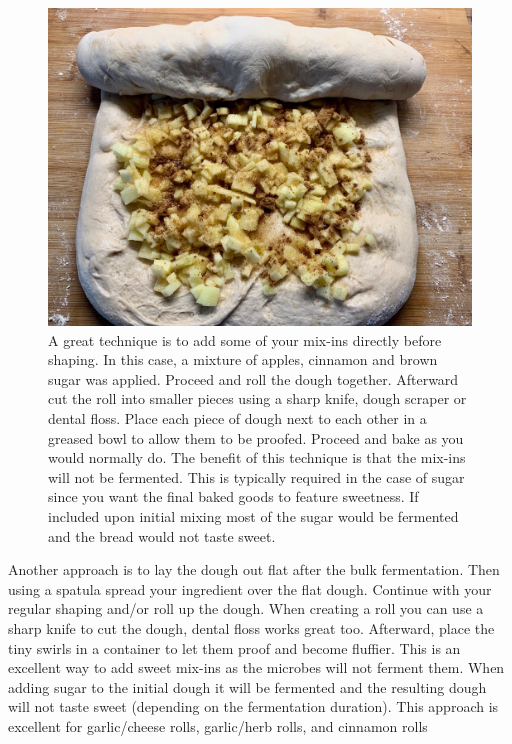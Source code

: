\begin{figure}[htb!]
  \centering
  \includegraphics[width=\textwidth]{apple-swirl}
  \caption[Apple swirl buns]{A great technique is to add some of your mix-ins
      directly before shaping. In this case, a mixture of apples, cinnamon and
      brown sugar was applied. Proceed and roll the dough together. Afterward
      cut the roll into smaller pieces using a sharp knife, dough scraper or
      dental floss. Place each piece of dough next to each other in a greased
      bowl to allow them to be proofed.  Proceed and bake as you would
      normally do. The benefit of this technique is that the mix-ins will not
      be fermented. This is typically required in the case of sugar since you
      want the final baked goods to feature sweetness. If included upon
      initial mixing most of the sugar would be fermented and the bread would
      not taste sweet.}%
  \label{fig:apple-swirl}
\end{figure}

Another approach is to lay the dough out flat after the bulk fermentation.
Then using a spatula spread your ingredient over the flat dough. Continue with
your regular shaping and/or roll up the dough. When creating a roll you can
use a sharp knife to cut the dough, dental floss works great too. Afterward,
place the tiny swirls in a container to let them proof and become fluffier.
This is an excellent way to add sweet mix-ins as the microbes will not ferment
them. When adding sugar to the initial dough it will be fermented and the
resulting dough will not taste sweet (depending on the fermentation duration).
This approach is excellent for garlic/cheese rolls, garlic/herb rolls, and
cinnamon rolls


